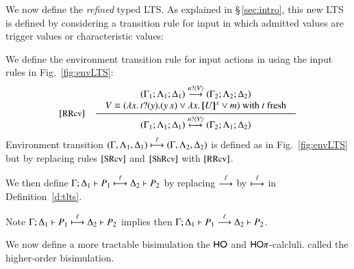 \smallskip 


We now define the \emph{refined} typed LTS. 
As explained in \S\,\ref{sec:intro}, this new LTS is defined 
by considering a transition rule for input in which admitted values are
 trigger values or characteristic values: 

\begin{definition}
\label{def:rlts}
We define the environment transition rule for input actions in
using the input rules in Fig.~\ref{fig:envLTS}: 
\[
\begin{array}{rl}
		\eltsrule{RRcv}&\tree {
\begin{array}{c}
(\Gamma_1; \Lambda_1; \Delta_1) \by{\bactinp{n}{V}} (\Gamma_2; \Lambda_2; \Delta_2)
\\
			\begin{array}{lll}
				 V  \scong
(\abs{{x}}{\binp{t}{y} (\appl{y}{{x}})}
 \vee  \abs{{x}}{\map{U}^{{x}}}  \vee m)  \textrm{ with } t \textrm{ fresh} 
			\end{array}
			\end{array}
		}{
			(\Gamma_1; \Lambda_1; \Delta_1) \hby{\bactinp{n}{V}} (\Gamma_2; \Lambda_1; \Delta_2)
		}
\end{array}
\]
\noi Environment transition
$(\Gamma, \Lambda_1, \Delta_1) \stackrel{\ell}{\longmapsto} (\Gamma, \Lambda_2, \Delta_2)$
is defined as in Fig.~\ref{fig:envLTS} but by replacing rules
$\eltsrule{SRcv}$ and $\eltsrule{ShRcv}$ with $\eltsrule{RRcv}$.

\noi We then define 
$\Gamma; \Delta_1 \vdash P_1 \stackrel{\ell}{\longmapsto} \Delta_2 \vdash P_2$
by replacing $\stackrel{\ell}{\longrightarrow}$ by $\stackrel{\ell}{\longmapsto}$ in Definition~\ref{d:tlts}. 
\end{definition}

\smallskip 

\noi Note 
$\Gamma; \Delta_1 \vdash P_1 \stackrel{\ell}{\longmapsto} \Delta_2 \vdash P_2$ implies  
then $\Gamma; \Delta_1 \vdash P_1 \stackrel{\ell}{\longrightarrow} \Delta_2 \vdash P_2$.

\smallskip 

 We now define 
a more tractable bisimulation the $\mathsf{HO}$ and $\mathsf{HO}\pi$-calcluli. 
called the higher-order bisimulation. 

